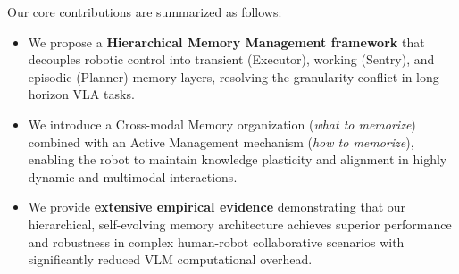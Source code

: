 Our core contributions are summarized as follows:
\begin{itemize} 
    \item We propose a \textbf{Hierarchical Memory Management framework} that decouples robotic control into transient (Executor), working (Sentry), and episodic (Planner) memory layers, resolving the granularity conflict in long-horizon VLA tasks.
    \item  We introduce a Cross-modal Memory organization (\textit{what to memorize}) combined with an Active Management mechanism (\textit{how to memorize}), enabling the robot to maintain knowledge plasticity and alignment in highly dynamic and multimodal interactions.
    \item We provide \textbf{extensive empirical evidence} demonstrating that our hierarchical, self-evolving memory architecture achieves superior performance and robustness in complex human-robot collaborative scenarios with significantly reduced VLM computational overhead.
\end{itemize}